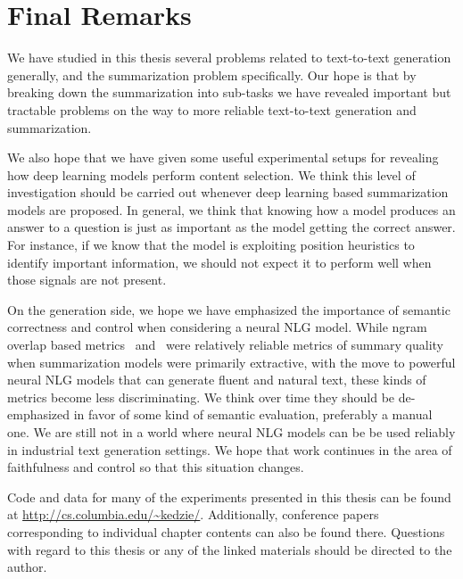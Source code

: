 \section{Final Remarks}

We have studied in this thesis several problems related to text-to-text
generation generally, and the summarization problem specifically.  Our hope is
that by breaking down the summarization into sub-tasks we have revealed
important but tractable problems on the way to more reliable text-to-text
generation and summarization. 

We also hope that we have given some useful experimental setups for revealing
how deep learning models perform content selection. We think this level of
investigation should be carried out whenever deep learning based summarization
models are proposed. In general, we think that knowing how a model produces an
answer to a question is just as important as the model getting the correct
answer. For instance, if we know that the model is exploiting position heuristics to identify important information, we should not expect it to perform well
when those signals are not present. 

On the generation side, we hope we have emphasized the importance of semantic
correctness and control when considering a neural NLG model. While ngram
overlap based metrics \rouge~and \bleu~were relatively reliable metrics of
summary quality when summarization models were primarily extractive, with the
move to powerful neural NLG models that can generate fluent and natural text,
these kinds of metrics become less discriminating.  We think over time they
should be de-emphasized in favor of some kind of semantic evaluation,
preferably a manual one. We are still not in a world where neural NLG models
can be be used reliably in industrial text generation settings. We hope that 
work continues in the area of faithfulness and control so that this situation
changes.


Code and data for many of the experiments presented in this thesis can be found
at \url{http://cs.columbia.edu/~kedzie/}. Additionally, conference papers
corresponding to individual chapter contents can also be found there. Questions 
with regard to this thesis or any of the linked materials should be directed to
the author.


